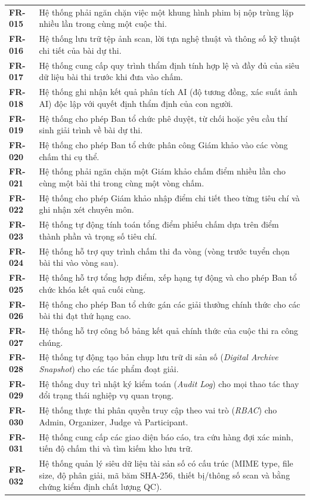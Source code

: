 \begin{table}[!ht]
\begin{tabularx}{\textwidth}{p{1.8cm}>{\raggedright\arraybackslash}X}
\textbf{FR-015} & Hệ thống phải ngăn chặn việc một khung hình phim bị nộp trùng lặp nhiều lần trong cùng một cuộc thi. \\
\textbf{FR-016} & Hệ thống lưu trữ tệp ảnh scan, lời tựa nghệ thuật và thông số kỹ thuật chi tiết của bài dự thi. \\
\textbf{FR-017} & Hệ thống cung cấp quy trình thẩm định tính hợp lệ và đầy đủ của siêu dữ liệu bài thi trước khi đưa vào chấm. \\
\textbf{FR-018} & Hệ thống ghi nhận kết quả phân tích AI (độ tương đồng, xác suất ảnh AI) độc lập với quyết định thẩm định của con người. \\
\textbf{FR-019} & Hệ thống cho phép Ban tổ chức phê duyệt, từ chối hoặc yêu cầu thí sinh giải trình về bài dự thi. \\
\textbf{FR-020} & Hệ thống cho phép Ban tổ chức phân công Giám khảo vào các vòng chấm thi cụ thể. \\
\textbf{FR-021} & Hệ thống phải ngăn chặn một Giám khảo chấm điểm nhiều lần cho cùng một bài thi trong cùng một vòng chấm. \\
\textbf{FR-022} & Hệ thống cho phép Giám khảo nhập điểm chi tiết theo từng tiêu chí và ghi nhận xét chuyên môn. \\
\textbf{FR-023} & Hệ thống tự động tính toán tổng điểm phiếu chấm dựa trên điểm thành phần và trọng số tiêu chí. \\
\textbf{FR-024} & Hệ thống hỗ trợ quy trình chấm thi đa vòng (vòng trước tuyển chọn bài thi vào vòng sau). \\
\textbf{FR-025} & Hệ thống hỗ trợ tổng hợp điểm, xếp hạng tự động và cho phép Ban tổ chức khóa kết quả cuối cùng. \\
\textbf{FR-026} & Hệ thống cho phép Ban tổ chức gán các giải thưởng chính thức cho các bài thi đạt thứ hạng cao. \\
\textbf{FR-027} & Hệ thống hỗ trợ công bố bảng kết quả chính thức của cuộc thi ra công chúng. \\
\textbf{FR-028} & Hệ thống tự động tạo bản chụp lưu trữ di sản số (\textit{Digital Archive Snapshot}) cho các tác phẩm đoạt giải. \\
\textbf{FR-029} & Hệ thống duy trì nhật ký kiểm toán (\textit{Audit Log}) cho mọi thao tác thay đổi trạng thái nghiệp vụ quan trọng. \\
\textbf{FR-030} & Hệ thống thực thi phân quyền truy cập theo vai trò (\textit{RBAC}) cho Admin, Organizer, Judge và Participant. \\
\textbf{FR-031} & Hệ thống cung cấp các giao diện báo cáo, tra cứu hàng đợi xác minh, tiến độ chấm thi và tìm kiếm kho lưu trữ. \\
\textbf{FR-032} & Hệ thống quản lý siêu dữ liệu tài sản số có cấu trúc (MIME type, file size, độ phân giải, mã băm SHA-256, thiết bị/thông số scan và bằng chứng kiểm định chất lượng QC). \\
\bottomrule
\end{tabularx}
\end{table}

